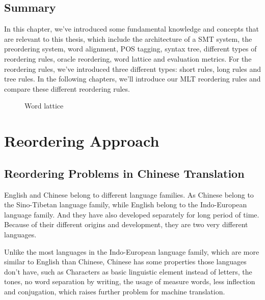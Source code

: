 \section{Summary}

In this chapter, we've introduced some fundamental knowledge and concepts that are relevant to this thesis, which include the architecture of a \ac{SMT} system, the preordering system, word alignment, \ac{POS} tagging, syntax tree, different types of reordering rules, oracle reordering, word lattice and evaluation metrics. For the reordering rules, we've introduced three different types: short rules, long rules and tree rules. In the following chapters, we'll introduce our \ac{MLT} reordering rules and compare these different reordering rules.

\begin{landscape}
\begin{figure}
\centering

\caption{Word lattice}
\label{Lattices}
\end{figure}
\end{landscape}

\chapter{Reordering Approach}
\label{ch:ReorderingApproach}

\section{Reordering Problems in Chinese Translation}
\label{ch:ReorderingApproach:sec:Problem}

English and Chinese belong to different language families. As Chinese belong to the Sino-Tibetan language family, while English belong to the Indo-European language family. And they have also developed separately for long period of time. Because of their different origins and development, they are two very different languages.

Unlike the most languages in the Indo-European language family, which are more similar to English than Chinese, Chinese has some properties those languages don't have, such as Characters as basic linguistic element instead of letters, the tones, no word separation by writing, the usage of measure words, less inflection and conjugation, which raises further problem for machine translation.

